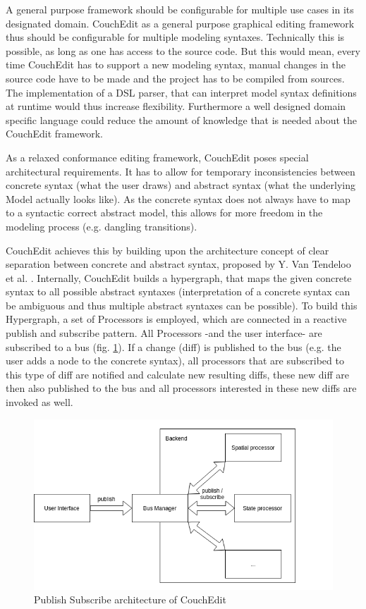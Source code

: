 \documentclass[10pt,a4paper,oneside]{scrartcl}
\begin{document}


A general purpose framework should be configurable for multiple use cases in its designated domain. CouchEdit as a general purpose graphical editing framework thus should be configurable for multiple modeling syntaxes. Technically this is possible, as long as one has access to the source code.
But this would mean, every time CouchEdit has to support a new modeling syntax, manual changes in the source code have to be made and the project has to be compiled from sources. The implementation of a DSL parser, that can interpret model syntax definitions at runtime would thus increase flexibility. Furthermore a well designed domain specific language could reduce the amount of knowledge that is needed about the CouchEdit framework.

As a relaxed conformance editing framework, CouchEdit poses special architectural requirements. It has to allow for temporary inconsistencies between concrete syntax (what the user draws) and abstract syntax (what the underlying Model actually looks like). As the concrete syntax does not always have to map to a syntactic correct abstract model, this allows for more freedom in the modeling process (e.g. dangling transitions).

CouchEdit achieves this by building upon the architecture concept of clear separation between concrete and abstract syntax, proposed by Y. Van Tendeloo et al. \cite{van_tendeloo_concrete_2017}. Internally, CouchEdit builds a hypergraph, that maps the given concrete syntax to all possible abstract syntaxes (interpretation of a concrete syntax can be ambiguous and thus multiple abstract syntaxes can be possible). To build this Hypergraph, a set of Processors is employed, which are connected in a reactive publish and subscribe pattern. All Processors -and the user interface- are subscribed to a bus (fig. \ref{fig:processors}). If a change (diff) is published to the bus (e.g. the user adds a node to the concrete syntax), all processors that are subscribed to this type of diff are notified and calculate new resulting diffs, these new diff are then also published to the bus and all processors interested in these new diffs are invoked as well.

\begin{figure}
  \label{fig:processors}
  \centering
  \includegraphics[width=.6\linewidth]{./couchedit-processors}
  \caption{Publish Subscribe architecture of CouchEdit}
\end{figure}
\end{document}
